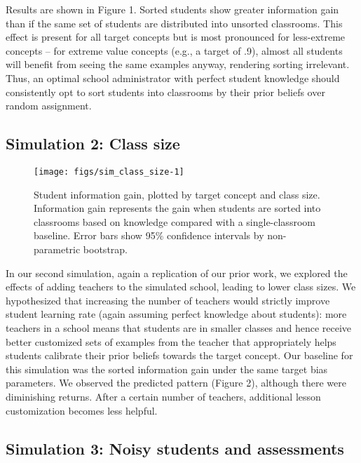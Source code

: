 \documentclass[10pt, letterpaper]{article}
\newenvironment{CodeChunk}{}{}
\begin{document}
Results are shown in Figure 1. Sorted students show greater information
gain than if the same set of students are distributed into unsorted
classrooms. This effect is present for all target concepts but is most
pronounced for less-extreme concepts -- for extreme value concepts
(e.g., a target of .9), almost all students will benefit from seeing the
same examples anyway, rendering sorting irrelevant. Thus, an optimal
school administrator with perfect student knowledge should consistently
opt to sort students into classrooms by their prior beliefs over random
assignment.

\subsection{Simulation 2: Class size}\label{simulation-2-class-size}

\begin{CodeChunk}
\begin{figure}[t]
\texttt{[image: figs/sim\_class\_size-1]} \caption[Student information gain, plotted by target concept and class size]{Student information gain, plotted by target concept and class size. Information gain represents the gain when students are sorted into classrooms based on knowledge compared with a single-classroom baseline. Error bars show 95\% confidence intervals by non-parametric bootstrap.}\label{fig:sim_class_size}
\end{figure}
\end{CodeChunk}

In our second simulation, again a replication of our prior work, we
explored the effects of adding teachers to the simulated school, leading
to lower class sizes. We hypothesized that increasing the number of
teachers would strictly improve student learning rate (again assuming
perfect knowledge about students): more teachers in a school means that
students are in smaller classes and hence receive better customized sets
of examples from the teacher that appropriately helps students calibrate
their prior beliefs towards the target concept. Our baseline for this
simulation was the sorted information gain under the same target bias
parameters. We observed the predicted pattern (Figure 2), although there
were diminishing returns. After a certain number of teachers, additional
lesson customization becomes less helpful.

\subsection{Simulation 3: Noisy students and
assessments}\label{simulation-3-noisy-students-and-assessments}
\end{document}
